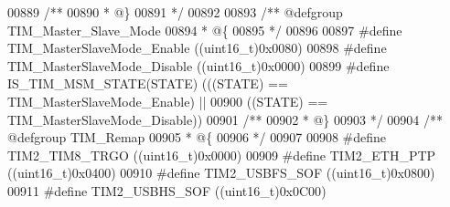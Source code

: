 \begin{DoxyCode}
00889 \textcolor{comment}{/**}
00890 \textcolor{comment}{  * @\}}
00891 \textcolor{comment}{  */}
00892 
00893 \textcolor{comment}{/** @defgroup TIM\_Master\_Slave\_Mode }
00894 \textcolor{comment}{  * @\{}
00895 \textcolor{comment}{  */}
00896 
00897 \textcolor{preprocessor}{#}\textcolor{preprocessor}{define} \textcolor{preprocessor}{TIM\_MasterSlaveMode\_Enable}         \textcolor{preprocessor}{(}\textcolor{preprocessor}{(}\textcolor{preprocessor}{uint16\_t}\textcolor{preprocessor}{)}0x0080\textcolor{preprocessor}{)}
00898 \textcolor{preprocessor}{#}\textcolor{preprocessor}{define} \textcolor{preprocessor}{TIM\_MasterSlaveMode\_Disable}        \textcolor{preprocessor}{(}\textcolor{preprocessor}{(}\textcolor{preprocessor}{uint16\_t}\textcolor{preprocessor}{)}0x0000\textcolor{preprocessor}{)}
00899 \textcolor{preprocessor}{#}\textcolor{preprocessor}{define} \textcolor{preprocessor}{IS\_TIM\_MSM\_STATE}\textcolor{preprocessor}{(}\textcolor{preprocessor}{STATE}\textcolor{preprocessor}{)} \textcolor{preprocessor}{(}\textcolor{preprocessor}{(}\textcolor{preprocessor}{(}\textcolor{preprocessor}{STATE}\textcolor{preprocessor}{)} \textcolor{preprocessor}{==} TIM_MasterSlaveMode_Enable\textcolor{preprocessor}{)} \textcolor{preprocessor}{||}
00900                                  \textcolor{preprocessor}{(}\textcolor{preprocessor}{(}\textcolor{preprocessor}{STATE}\textcolor{preprocessor}{)} \textcolor{preprocessor}{==} TIM_MasterSlaveMode_Disable\textcolor{preprocessor}{)}\textcolor{preprocessor}{)}
00901 \textcolor{comment}{/**}
00902 \textcolor{comment}{  * @\}}
00903 \textcolor{comment}{  */}
00904 \textcolor{comment}{/** @defgroup TIM\_Remap }
00905 \textcolor{comment}{  * @\{}
00906 \textcolor{comment}{  */}
00907 
00908 \textcolor{preprocessor}{#}\textcolor{preprocessor}{define} \textcolor{preprocessor}{TIM2\_TIM8\_TRGO}                     \textcolor{preprocessor}{(}\textcolor{preprocessor}{(}\textcolor{preprocessor}{uint16\_t}\textcolor{preprocessor}{)}0x0000\textcolor{preprocessor}{)}
00909 \textcolor{preprocessor}{#}\textcolor{preprocessor}{define} \textcolor{preprocessor}{TIM2\_ETH\_PTP}                       \textcolor{preprocessor}{(}\textcolor{preprocessor}{(}\textcolor{preprocessor}{uint16\_t}\textcolor{preprocessor}{)}0x0400\textcolor{preprocessor}{)}
00910 \textcolor{preprocessor}{#}\textcolor{preprocessor}{define} \textcolor{preprocessor}{TIM2\_USBFS\_SOF}                     \textcolor{preprocessor}{(}\textcolor{preprocessor}{(}\textcolor{preprocessor}{uint16\_t}\textcolor{preprocessor}{)}0x0800\textcolor{preprocessor}{)}
00911 \textcolor{preprocessor}{#}\textcolor{preprocessor}{define} \textcolor{preprocessor}{TIM2\_USBHS\_SOF}                     \textcolor{preprocessor}{(}\textcolor{preprocessor}{(}\textcolor{preprocessor}{uint16\_t}\textcolor{preprocessor}{)}0x0C00\textcolor{preprocessor}{)}

\end{DoxyCode}
